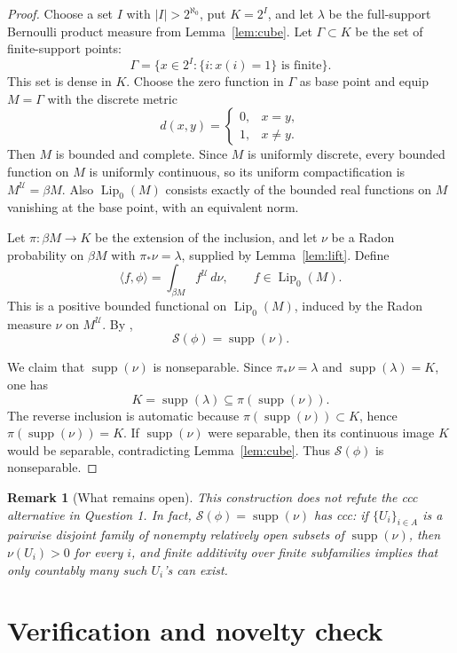 \documentclass[11pt]{article}
\newtheorem{remark}{Remark}
\DeclareMathOperator{\Lip}{Lip}
\DeclareMathOperator{\supp}{supp}
\newcommand{\MU}{M^{\mathcal U}}
\newcommand{\SM}{\mathcal S}
\newcommand{\ip}[2]{\langle #1,#2\rangle}
\begin{document}
\begin{proof}
Choose a set \(I\) with \(|I|>2^{\aleph_0}\), put \(K=2^I\), and let
\(\lambda\) be the full-support Bernoulli product measure from
Lemma~\ref{lem:cube}.  Let \(\Gamma\subset K\) be the set of finite-support
points:
\[
        \Gamma=\{x\in 2^I:\{i:x(i)=1\}\text{ is finite}\}.
\]
This set is dense in \(K\).  Choose the zero function in \(\Gamma\) as base
point and equip \(M=\Gamma\) with the discrete metric
\[
        d(x,y)=\begin{cases}0,&x=y,\\1,&x\ne y.\end{cases}
\]
Then \(M\) is bounded and complete.  Since \(M\) is uniformly discrete, every
bounded function on \(M\) is uniformly continuous, so its uniform
compactification is \(\MU=\beta M\).  Also \(\Lip_0(M)\) consists exactly of
the bounded real functions on \(M\) vanishing at the base point, with an
equivalent norm.

Let \(\pi:\beta M\to K\) be the extension of the inclusion, and let \(\nu\) be
a Radon probability on \(\beta M\) with \(\pi_*\nu=\lambda\), supplied by
Lemma~\ref{lem:lift}.  Define
\[
        \ip{f}{\phi}=\int_{\beta M} f^{\mathcal U}\,d\nu,
        \qquad f\in\Lip_0(M).
\]
This is a positive bounded functional on \(\Lip_0(M)\), induced by the Radon
measure \(\nu\) on \(\MU\).  By \cite[Proposition 4.7]{AP},
\[
        \SM(\phi)=\supp(\nu).
\]

We claim that \(\supp(\nu)\) is nonseparable.  Since \(\pi_*\nu=\lambda\) and
\(\supp(\lambda)=K\), one has
\[
        K=\supp(\lambda)\subseteq \pi(\supp(\nu)).
\]
The reverse inclusion is automatic because \(\pi(\supp(\nu))\subset K\), hence
\(\pi(\supp(\nu))=K\).  If \(\supp(\nu)\) were separable, then its continuous
image \(K\) would be separable, contradicting Lemma~\ref{lem:cube}.  Thus
\(\SM(\phi)\) is nonseparable.
\end{proof}

\begin{remark}[What remains open]
This construction does not refute the ccc alternative in Question 1.  In fact,
\(\SM(\phi)=\supp(\nu)\) has ccc: if \(\{U_i\}_{i\in A}\) is a pairwise
disjoint family of nonempty relatively open subsets of \(\supp(\nu)\), then
\(\nu(U_i)>0\) for every \(i\), and finite additivity over finite subfamilies
implies that only countably many such \(U_i\)'s can exist.
\end{remark}

\section*{Verification and novelty check}
\end{document}
